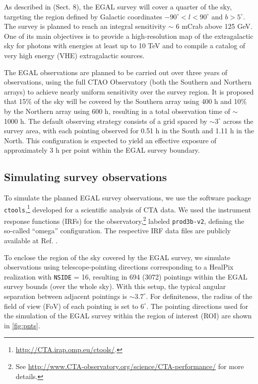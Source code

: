 \documentclass[aps,prd,a4paper,reprint,nofootinbib,superscriptaddress,floatfix,preprintnumbers]{revtex4-2}
\begin{document}
As described in \cite{CTAConsortium:2017dvg} (Sect. 8), the EGAL survey will cover a quarter of the sky, targeting the region defined by Galactic coordinates $-90^\circ < l < 90^\circ$ and $b > 5^\circ$. The survey is planned to reach an integral sensitivity $\sim$ 6 mCrab above 125 GeV. One of its main objectives is to provide a high-resolution map of the extragalactic sky for photons with energies at least up to 10 TeV and to compile a catalog of very high energy (VHE) extragalactic sources.

The EGAL observations are planned to be carried out over three years of observations, using the full CTAO Observatory (both the Southern and Northern arrays) to achieve nearly uniform sensitivity over the survey region. It is proposed that 15\% of the sky will be covered by the Southern array using 400 h and 10\% by the Northern array using 600 h, resulting in a total observation time of $\sim$ 1000 h. The default {observing strategy consists of a grid spaced by $\sim 3^\circ$ across the survey area, with each pointing observed for 0.51 h in the South and 1.11 h in the North. This configuration is expected to yield an effective exposure of approximately 3 h per point within the EGAL survey boundary.} 

\subsection{Simulating survey observations}
To simulate the planned EGAL survey observations, we use the software package \texttt{ctools},\footnote{\url{http://CTA.irap.omp.eu/ctools/}.} developed for a scientific analysis of CTA data. 
We used the instrument response functions (IRFs) for the observatory,\footnote{See \url{http://www.CTA-observatory.org/science/CTA-performance/} for more details.} labeled \texttt{prod3b-v2}, defining the so-called ``omega'' configuration. The respective IRF data files are publicly available at Ref. \cite{zenodo_ctao}.

To enclose the region of the sky covered by the EGAL survey, we simulate observations using telescope-pointing directions corresponding to a HealPix realization with \texttt{NSIDE} = 16, resulting in 694 (3072) pointings within the EGAL survey bounds (over the whole sky). With this setup, the typical angular separation between adjacent pointings is $\sim 3.7^\circ$. {For definiteness,} the radius of the field of view (FoV) of each pointing is set to $6^\circ$. The pointing directions used for the simulation of the EGAL survey within the region of interest (ROI) are shown in \cref{fig:pnts}.
\end{document}
